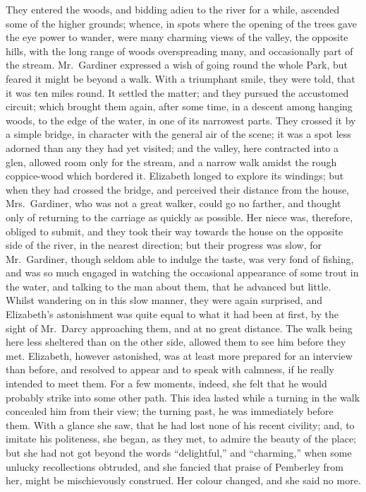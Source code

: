 They entered the woods, and bidding adieu to the river
for a while, ascended some of the higher grounds; whence,
in spots where the opening of the trees gave the eye power
to wander, were many charming views of the valley, the
opposite hills, with the long range of woods overspreading
many, and occasionally part of the stream. Mr.\ Gardiner
expressed a wish of going round the whole Park, but
feared it might be beyond a walk. With a triumphant
smile, they were told, that it was ten miles round. It
settled the matter; and they pursued the accustomed
circuit; which brought them again, after some time, in
a descent among hanging woods, to the edge of the water,
in one of its narrowest parts. They crossed it by a simple
bridge, in character with the general air of the scene;
it was a spot less adorned than any they had yet visited;
and the valley, here contracted into a glen, allowed room
only for the stream, and a narrow walk amidst the rough
coppice-wood which bordered it. Elizabeth longed to
explore its windings; but when they had crossed the
bridge, and perceived their distance from the house,
Mrs.\ Gardiner, who was not a great walker, could go no
farther, and thought only of returning to the carriage as
quickly as possible. Her niece was, therefore, obliged to
submit, and they took their way towards the house on
the opposite side of the river, in the nearest direction;
but their progress was slow, for Mr.\ Gardiner, though
seldom able to indulge the taste, was very fond of fishing,
and was so much engaged in watching the occasional
appearance of some trout in the water, and talking to
the man about them, that he advanced but little. Whilst
wandering on in this slow manner, they were again surprised,
and Elizabeth’s astonishment was quite equal to
what it had been at first, by the sight of Mr.\ Darcy
approaching them, and at no great distance. The walk
being here less sheltered than on the other side, allowed
them to see him before they met. Elizabeth, however
astonished, was at least more prepared for an interview
than before, and resolved to appear and to speak with
calmness, if he really intended to meet them. For a few
moments, indeed, she felt that he would probably strike
into some other path. This idea lasted while a turning
in the walk concealed him from their view; the turning
past, he was immediately before them. With a glance
she saw, that he had lost none of his recent civility; and,
to imitate his politeness, she began, as they met, to admire
the beauty of the place; but she had not got beyond the
words “delightful,” and “charming,” when some unlucky
recollections obtruded, and she fancied that praise
of Pemberley from her, might be mischievously construed.
Her colour changed, and she said no more.

